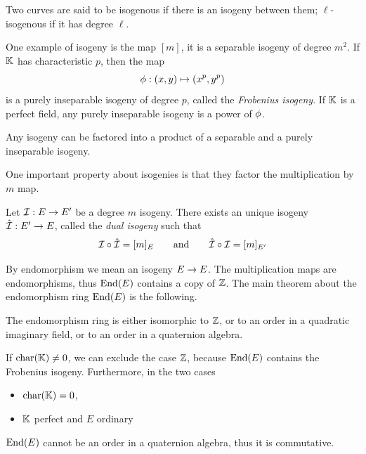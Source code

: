 Two curves are said to be isogenous if there is an isogeny between
them; $\ell$-isogenous if it has degree $\ell$.

One example of isogeny is the map $[m]$, it is a separable isogeny of
degree $m^2$. If $\mathbb{K}$ has characteristic $p$, then the map
\begin{equation}
  \label{eq:139}
  \phi : (x,y) \mapsto (x^p,y^p)
\end{equation}
is a purely inseparable isogeny of degree $p$, called the
\emph{Frobenius
  isogeny}. If $\mathbb{K}$ is a perfect field, any purely
inseparable isogeny is a power of $\phi$.

\begin{theorem}
  Any isogeny can be factored into a product of a separable and a
  purely inseparable isogeny.
\end{theorem}

One important property about isogenies is that they factor the
multiplication by $m$ map.

\begin{definition}
  Let $\mathcal{I} : E \rightarrow E'$ be a degree $m$ isogeny. There exists an
  unique isogeny $\hat{\mathcal{I}} : E' \rightarrow E$, called the
  \emph{dual isogeny} such
  that
  \[\mathcal{I}\circ\hat{\mathcal{I}} = [m]_E \qquad\text{and}\qquad \hat{\mathcal{I}}\circ\mathcal{I} =
  [m]_{E'}\]
\end{definition}

By endomorphism we mean an isogeny $E\rightarrow E$. The multiplication maps
are endomorphisms, thus $\operatorname{End}(E)$ contains a copy of $\mathbb{Z}$.  The main
theorem about the endomorphism ring $\operatorname{End}(E)$ is the following.

\begin{theorem}
  The endomorphism ring is either isomorphic to $\mathbb{Z}$, or to an order
  in a quadratic imaginary field, or to an order in a quaternion
  algebra.
\end{theorem}

If $\operatorname{char}(\mathbb{K})\ne0$, we can exclude the case $\mathbb{Z}$, because $\operatorname{End}(E)$
contains the Frobenius isogeny. Furthermore, in the two cases
\begin{itemize}
\item $\operatorname{char}(\mathbb{K})=0$,
\item $\mathbb{K}$ perfect and $E$ ordinary
\end{itemize}
$\operatorname{End}(E)$ cannot be an order in a quaternion algebra, thus it is
commutative.


